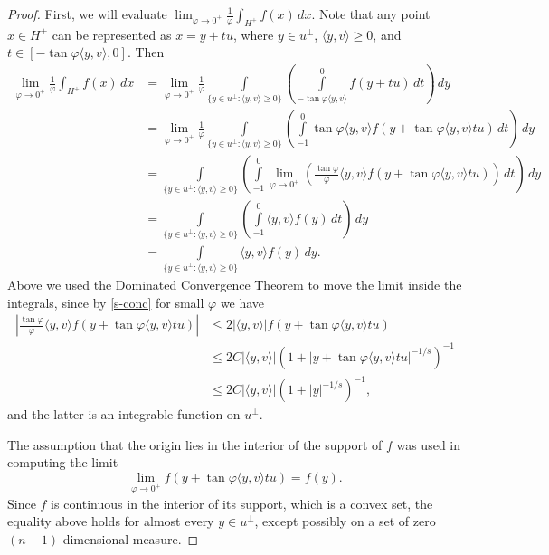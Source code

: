 \documentclass[10pt,a4paper]{amsart}
\begin{document}
\begin{proof}
						First, we will evaluate   $\lim_{\varphi \to 0^+}\frac{1}{\varphi}\int_{H^+} f(x) \, dx$.
							Note that any point $x \in H^+$ can be represented as $x = y + t u$, where $y \in u^\perp$, $ \langle y,v\rangle \ge 0$, and  $t \in [-\tan\varphi \langle y,v\rangle, 0]$.  Then
					\begin{align*}
					\lim_{\varphi\to 0^+} \frac1{\varphi}	\int_{H^+} f(x) \, dx & = \lim_{\varphi\to 0^+} \frac1{\varphi}\int\limits_{\{ y\in u^\perp:\langle y,v\rangle\ge 0\}} \left( \int\limits_{-\tan\varphi \langle y,v\rangle }^0 f(y + tu)\, dt \right) \,dy\\
					& = \lim_{\varphi\to 0^+} \frac1{\varphi}\int\limits_{\{ y\in u^\perp:\langle y,v\rangle\ge 0\}} \left(\int\limits_{-1 }^0 \tan\varphi \langle y,v\rangle f\left(y + \tan\varphi \langle y,v\rangle tu\right)\, dt \right)\, dy\\
					& = \int\limits_{\{ y\in u^\perp:\langle y,v\rangle\ge 0\}} \left( \int\limits_{-1 }^0 \lim_{\varphi\to 0^+}\left( \frac{\tan\varphi}{\varphi}  \langle y,v\rangle f\left(y + \tan\varphi \langle y,v\rangle tu\right)\right)\, dt \right)\, dy\\
					& = \int\limits_{\{ y\in u^\perp:\langle y,v\rangle\ge 0\}} \left(\int\limits_{-1 }^0   \langle y,v\rangle f\left(y \right) \, dt \right)\, dy\\
				& = \int\limits_{\{ y\in u^\perp:\langle y,v\rangle\ge 0\}}    \langle y,v\rangle f\left(y \right) \,   dy.
						\end{align*}						
							Above we used  the Dominated Convergence Theorem  to move the limit inside the integrals, since	by \eqref{s-conc} for small $\varphi$ 	we have					
				\begin{align*}
						\left| \frac{\tan\varphi}{\varphi}  \langle y,v\rangle f\left(y + \tan\varphi \langle y,v\rangle tu\right) \right| & \leq  2 |\langle y,v\rangle| f\left(y + \tan\varphi \langle y,v\rangle tu\right)\\
						& \leq  2 C |\langle y,v\rangle| {(1+|y + \tan\varphi \langle y,v\rangle tu|^{-1/s})^{-1}}\\
						& \le 2 C |\langle y,v\rangle| {(1+|y |^{-1/s})^{-1}},
					\end{align*}
						and the  latter is an integrable function on $u^\perp$.		
						
						
						The assumption that the origin lies in the interior of the support of 
						$f$  was used in computing the limit 	$$\lim_{\varphi\to 0^+}f\left(y + \tan\varphi \langle y,v\rangle tu\right)= f\left(y\right).$$ Since $f$ is continuous in the interior of its support, which is a convex set,   the equality above holds for almost every  $y\in u^\perp$, except possibly on a set of  zero $(n-1)$-dimensional measure.
						

\end{proof}
\end{document}
